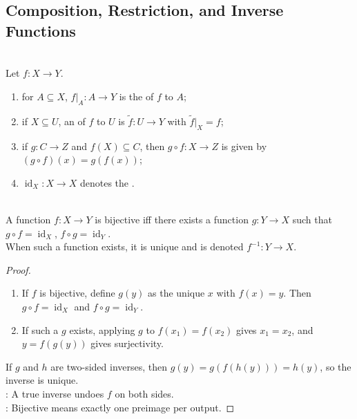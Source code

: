 \subsection{Composition, Restriction, and Inverse Functions}

\begin{definition} \\
Let $f:X\to Y$.
\begin{enumerate}[label=(\roman*)]
\setlength{\itemsep}{0pt}
\item for $A\subseteq X$, $f|_A:A\to Y$ is the  of $f$ to $A$;
\item if $X\subseteq U$, an  of $f$ to $U$ is $\widetilde f:U\to Y$ with $\widetilde f|_X=f$;
\item if $g:C\to Z$ and $f(X)\subseteq C$, then $g\circ f:X\to Z$ is given by $(g\circ f)(x)=g(f(x))$;
\item $\operatorname{id}_X:X\to X$ denotes the .
\end{enumerate}
\end{definition}

\begin{theorem} \label{thm:bijective-iff-invertible-function} \\
A function $f:X\to Y$ is bijective iff there exists a function $g:Y\to X$ such that $g\circ f=\operatorname{id}_X$, $f\circ g=\operatorname{id}_Y$.\\
When such a function exists, it is unique and is denoted $f^{-1}:Y\to X$.
\begin{proof}
\begin{enumerate}[label=\roman*.]
\setlength{\itemsep}{0pt}
\item[$(\Rightarrow)$] If $f$ is bijective, define $g(y)$ as the unique $x$ with $f(x)=y$. Then $g\circ f=\operatorname{id}_X$ and $f\circ g=\operatorname{id}_Y$.
\item[$(\Leftarrow)$] If such a $g$ exists, applying $g$ to $f(x_1)=f(x_2)$ gives $x_1=x_2$, and $y=f(g(y))$ gives surjectivity.
\end{enumerate}
If $g$ and $h$ are two-sided inverses, then $g(y)=g(f(h(y)))=h(y)$, so the inverse is unique.\\
: A true inverse undoes $f$ on both sides.\\
: Bijective means exactly one preimage per output.
\end{proof}
\end{theorem}

